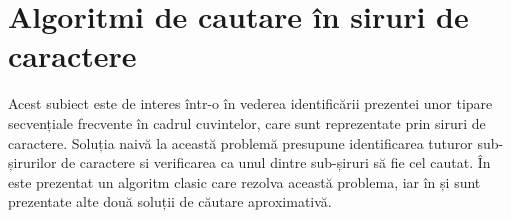 \section{Algoritmi de cautare în siruri de caractere}

Acest subiect este de interes într-o în vederea identificării prezentei unor tipare secvențiale frecvente în cadrul cuvintelor, care sunt reprezentate prin siruri de caractere. Soluția naivă la această problemă presupune identificarea tuturor sub-șirurilor de caractere si verificarea ca unul dintre sub-șiruri să fie cel cautat. În \cite{bib:knuth1977fast} este prezentat un algoritm clasic care rezolva această problema, iar în  \cite{bib:baeza1992new} și \cite{bib:baeza1996faster} sunt prezentate alte două soluții de căutare aproximativă.

